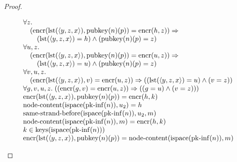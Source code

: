 \documentclass[11pt]{article}
\theoremstyle{plain}
\begin{document}
\begin{proof}
\begin{itemize}[leftmargin=2.8em, itemsep=4pt, parsep=1pt]
\begin{itemize}[leftmargin=2.8em, itemsep=4pt, parsep=1pt]
\begin{equation*}
\begin{array}{@{}l@{}}
\begin{array}{@{}l@{}} \forall z. \\ \quad (\operatorname{encr}(\operatorname{lst}(\langle y, z, x \rangle), \operatorname{pubkey}(n)(p)) = \operatorname{encr}(h, z)) \Rightarrow  \\ \quad \quad (\operatorname{lst}(\langle y, z, x \rangle) = h) \wedge (\operatorname{pubkey}(n)(p) = z) \end{array} \\
\begin{array}{@{}l@{}} \forall u, z. \\ \quad (\operatorname{encr}(\operatorname{lst}(\langle y, z, x \rangle), \operatorname{pubkey}(n)(p)) = \operatorname{encr}(u, z)) \Rightarrow  \\ \quad \quad (\operatorname{lst}(\langle y, z, x \rangle) = u) \wedge (\operatorname{pubkey}(n)(p) = z) \end{array} \\
\begin{array}{@{}l@{}} \forall v, u, z. \\ \quad (\operatorname{encr}(\operatorname{lst}(\langle y, z, x \rangle), v) = \operatorname{encr}(u, z)) \Rightarrow ((\operatorname{lst}(\langle y, z, x \rangle) = u) \wedge (v = z)) \end{array} \\
\forall g, v, u, z.\; ((\operatorname{encr}(g, v) = \operatorname{encr}(u, z)) \Rightarrow ((g = u) \wedge (v = z))) \\
\operatorname{encr}(\operatorname{lst}(\langle y, z, x \rangle), \operatorname{pubkey}(n)(p)) = \operatorname{encr}(h, k) \\
\operatorname{node\text{-}content}(\operatorname{ispace}(\operatorname{pk\text{-}inf}(n)), u_{2}) = h \\
\operatorname{same\text{-}strand\text{-}before}(\operatorname{ispace}(\operatorname{pk\text{-}inf}(n)), u_{2}, m) \\
\operatorname{node\text{-}content}(\operatorname{ispace}(\operatorname{pk\text{-}inf}(n)), m) = \operatorname{encr}(h, k) \\
k \in \operatorname{keys}(\operatorname{ispace}(\operatorname{pk\text{-}inf}(n))) \\
\operatorname{encr}(\operatorname{lst}(\langle y, z, x \rangle), \operatorname{pubkey}(n)(p)) = \operatorname{node\text{-}content}(\operatorname{ispace}(\operatorname{pk\text{-}inf}(n)), m) \\

\end{array}
\end{equation*}
\end{itemize}
\end{itemize}
\end{proof}
\end{document}
